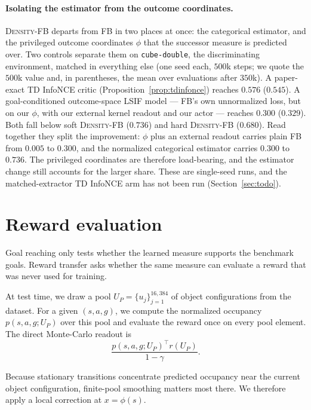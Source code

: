 \documentclass{article}
\newcommand{\DensityFB}{\textsc{Density-FB}}
\begin{document}
\paragraph{Isolating the estimator from the outcome coordinates.}
\DensityFB{} departs from FB in two places at once: the categorical estimator, and the privileged outcome coordinates $\phi$ that the successor measure is predicted over.
Two controls separate them on \texttt{cube-double}, the discriminating environment, matched in everything else (one seed each, $500$k steps; we quote the $500$k value and, in parentheses, the mean over evaluations after $350$k).
A paper-exact TD InfoNCE critic (Proposition~\ref{prop:tdinfonce}) reaches $0.576$ ($0.545$).
A goal-conditioned outcome-space LSIF model --- FB's own unnormalized loss, but on our $\phi$, with our external kernel readout and our actor --- reaches $0.300$ ($0.329$).
Both fall below soft \DensityFB{} ($0.736$) and hard \DensityFB{} ($0.680$).
Read together they split the improvement: $\phi$ plus an external readout carries plain FB from $0.005$ to $0.300$, and the normalized categorical estimator carries $0.300$ to $0.736$.
The privileged coordinates are therefore load-bearing, and the estimator change still accounts for the larger share.
These are single-seed runs, and the matched-extractor TD InfoNCE arm has not been run (Section~\ref{sec:todo}).

\section{Reward evaluation}
\label{sec:reward-transfer}

Goal reaching only tests whether the learned measure supports the benchmark goals.
Reward transfer asks whether the same measure can evaluate a reward that was never used for training.

At test time, we draw a pool $U_P=\{u_j\}_{j=1}^{16{,}384}$ of object configurations from the dataset.
For a given $(s,a,g)$, we compute the normalized occupancy $p(s,a,g;U_P)$ over this pool and evaluate the reward once on every pool element.
The direct Monte-Carlo readout is
\begin{equation}
    \frac{ p(s,a,g;U_P)^\top r(U_P) }{ 1-\gamma}.
\end{equation}

Because stationary transitions concentrate predicted occupancy near the current object configuration, finite-pool smoothing matters most there.
We therefore apply a local correction at $x=\phi(s).$
\end{document}
